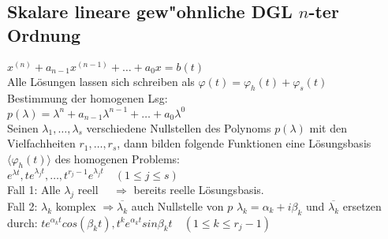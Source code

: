 \documentclass[10pt,a4paper^, twocolumn]{article}
\renewcommand{\phi}{\varphi} %
\begin{document}
\subsection{Skalare lineare gew"ohnliche DGL $n$-ter Ordnung}
$x^{(n)} + a_{n-1}x^{(n-1)} + \dots + a_0x = b(t)$ \\
Alle Lösungen lassen sich schreiben als $\phi(t) = \phi_h(t) + \phi_s(t)$ \\
Bestimmung der homogenen Lsg: \\
$p(\lambda) = \lambda^n + a_{n-1}\lambda^{n-1} + \dots + a_0\lambda^0$  \\
Seinen $\lambda_1,\dots,\lambda_s$ verschiedene Nullstellen des Polynoms $p(\lambda)$ mit den Vielfachheiten $r_1,\dots,r_s$,
dann bilden folgende Funktionen eine Lösungsbasis $\langle \phi_h(t) \rangle$ des homogenen Problems: \\
$e^{\lambda t}, te^{\lambda_jt},\dots,t^{r_j-1}e^{\lambda_jt} \quad ( 1 \leq j \leq s )$ \\
Fall 1: Alle $\lambda_j$ reell $\quad \Rightarrow$ bereits reelle Lösungsbasis. \\
Fall 2: $\lambda_k$ komplex $\Rightarrow \overline{\lambda_k}$ auch Nullstelle von $p$
	$\lambda_k = \alpha_k + i\beta_k$ und $\overline{\lambda_k}$ ersetzen durch: 
	$te^{\alpha_kt}cos(\beta_kt), t^ke^{\alpha_kt}sin{\beta_kt} \quad (1 \leq k \leq r_j-1)$
\end{document}
